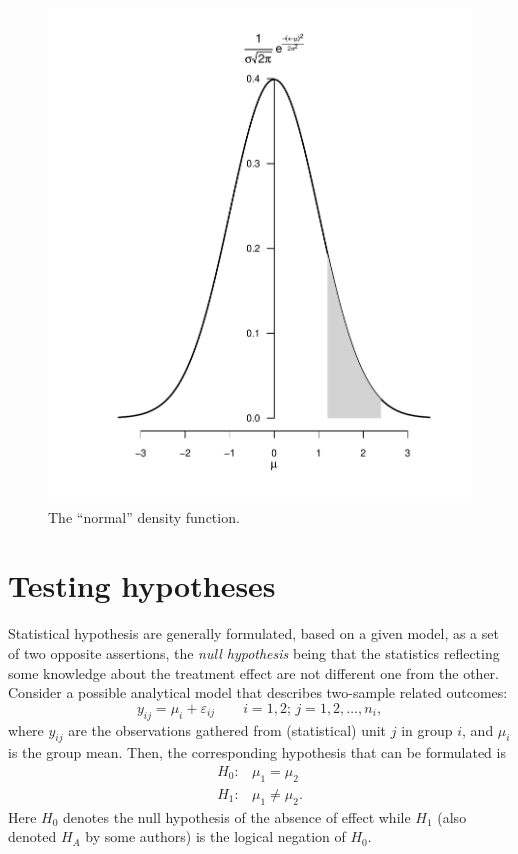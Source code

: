 \documentclass[11pt,a4paper]{memoir}\usepackage[]{graphicx}\usepackage[]{color}
\makeatletter
\def\maxwidth{ %
  \ifdim\Gin@nat@width>\linewidth
    \linewidth
  \else
    \Gin@nat@width
  \fi
}
\newenvironment{knitrout}{}{} %
\makeatother
\begin{document}
\begin{figure}[htb]
\begin{knitrout}
{\centering \includegraphics[width=\maxwidth]{figs/normdist-1} 

}



\end{knitrout}
\caption{The ``normal'' density function.}\label{fig:gauss} 
\end{figure}

\section{Testing hypotheses}
\label{sec:testing-hypotheses}
Statistical hypothesis are generally formulated, based on a given
model, as a set of two opposite assertions, the \emph{null hypothesis}
being that the statistics reflecting some knowledge about the
treatment effect are not different one from the other. Consider a
possible analytical model that describes two-sample related outcomes:
\begin{equation}\label{eq:model1}
  y_{ij}=\mu_i+\varepsilon_{ij}\qquad i=1,2;\, j=1,2,\dots,n_i,
\end{equation}
where $y_{ij}$ are the observations gathered from (statistical) unit
$j$ in group $i$, and $\mu_i$ is the group mean.
Then, the corresponding hypothesis that can be formulated is
\begin{equation}\label{eq:hyp1}
  \begin{array}{ll}
    H_0: & \mu_1=\mu_2 \\
    H_1: & \mu_1\neq\mu_2.
  \end{array}
\end{equation}
Here $H_0$ denotes the null hypothesis of the absence of effect while
$H_1$ (also denoted $H_A$ by some authors) is the logical negation of
$H_0$.
\end{document}
